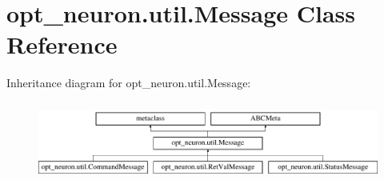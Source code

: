 \hypertarget{classopt__neuron_1_1util_1_1Message}{}\section{opt\+\_\+neuron.\+util.\+Message Class Reference}
\label{classopt__neuron_1_1util_1_1Message}
Inheritance diagram for opt\+\_\+neuron.\+util.\+Message\+:\begin{figure}[H]
\begin{center}
\leavevmode
\includegraphics[height=2.616822cm]{classopt__neuron_1_1util_1_1Message}
\end{center}
\end{figure}
